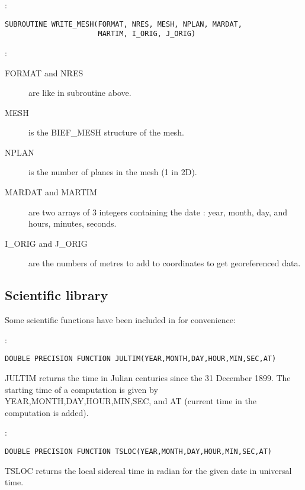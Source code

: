 :
\begin{lstlisting}[language=TelFortran]
SUBROUTINE WRITE_MESH(FORMAT, NRES, MESH, NPLAN, MARDAT,
                      MARTIM, I_ORIG, J_ORIG)
\end{lstlisting}

:
\begin{description}
  \item [FORMAT and NRES] are like in subroutine 
    above.
  \item [MESH] is the BIEF\_MESH structure of the mesh.
  \item [NPLAN] is the number of planes in the mesh (1 in 2D).
  \item [MARDAT and MARTIM] are two arrays of 3 integers containing the date :
    year, month, day, and hours, minutes, seconds.
  \item [I\_ORIG and J\_ORIG] are the numbers of metres to add to coordinates
    to get georeferenced data.
\end{description}

\subsection{Scientific library}

Some scientific functions have been included in \bief for convenience:

%

:
\begin{lstlisting}[language=TelFortran]
DOUBLE PRECISION FUNCTION JULTIM(YEAR,MONTH,DAY,HOUR,MIN,SEC,AT)
\end{lstlisting}

JULTIM returns the time in Julian centuries since the 31 December 1899. The
starting time of a computation is given by YEAR,MONTH,DAY,HOUR,MIN,SEC, and AT
(current time in the computation is added).

:
\begin{lstlisting}[language=TelFortran]
DOUBLE PRECISION FUNCTION TSLOC(YEAR,MONTH,DAY,HOUR,MIN,SEC,AT)
\end{lstlisting}

TSLOC returns the local sidereal time in radian for the given date in
universal time.

